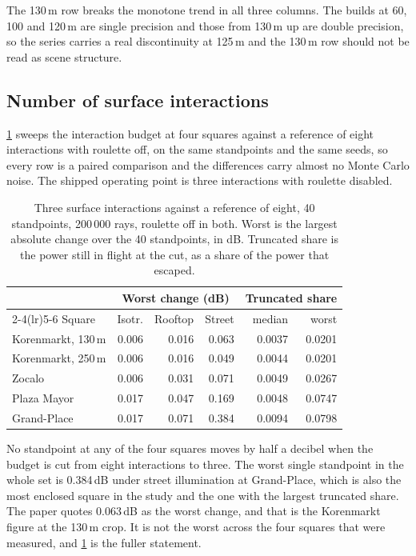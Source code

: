 \documentclass[journal]{IEEEtran}
\begin{document}
The 130\,m row breaks the monotone trend in all three columns. The builds at 60,
100 and 120\,m are single precision and those from 130\,m up are double
precision, so the series carries a real discontinuity at 125\,m and the 130\,m
row should not be read as scene structure.

\subsection{Number of surface interactions}

\cref{tab:si-budget} sweeps the interaction budget at four squares against a
reference of eight interactions with roulette off, on the same standpoints and
the same seeds, so every row is a paired comparison and the differences carry
almost no Monte Carlo noise. The shipped operating point is three interactions
with roulette disabled.

\begin{table}[t]
  \centering
  \caption{Three surface interactions against a reference of eight, 40
  standpoints, 200\,000 rays, roulette off in both. Worst is the largest
  absolute change over the 40 standpoints, in dB. Truncated share is the power
  still in flight at the cut, as a share of the power that escaped.}
  \label{tab:si-budget}
  \footnotesize
  \setlength{\tabcolsep}{4pt}
  \begin{tabular}{lrrrrr}
    \toprule
    & \multicolumn{3}{c}{Worst change (dB)} & \multicolumn{2}{c}{Truncated share} \\
    \cmidrule(lr){2-4}\cmidrule(lr){5-6}
    Square & Isotr. & Rooftop & Street & median & worst \\
    \midrule
    Korenmarkt, 130\,m & 0.006 & 0.016 & 0.063 & 0.0037 & 0.0201 \\
    Korenmarkt, 250\,m & 0.006 & 0.016 & 0.049 & 0.0044 & 0.0201 \\
    Zocalo             & 0.006 & 0.031 & 0.071 & 0.0049 & 0.0267 \\
    Plaza Mayor        & 0.017 & 0.047 & 0.169 & 0.0048 & 0.0747 \\
    Grand-Place        & 0.017 & 0.071 & 0.384 & 0.0094 & 0.0798 \\
    \bottomrule
  \end{tabular}
\end{table}

No standpoint at any of the four squares moves by half a decibel when the budget
is cut from eight interactions to three. The worst single standpoint in the
whole set is 0.384\,dB under street illumination at Grand-Place, which is also
the most enclosed square in the study and the one with the largest truncated
share. The paper quotes 0.063\,dB as the worst change, and that is the
Korenmarkt figure at the 130\,m crop. It is not the worst across the four
squares that were measured, and \cref{tab:si-budget} is the fuller statement.
\end{document}
